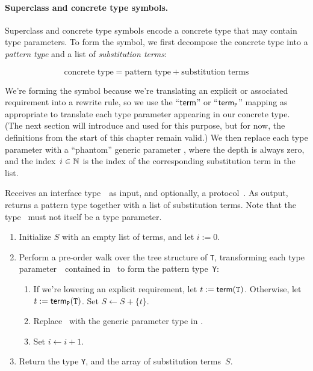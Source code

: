 \documentclass[../generics]{subfiles}
\begin{document}
\paragraph{Superclass and concrete type symbols.}
Superclass and concrete type symbols encode a concrete type that may contain type parameters. To form the symbol, we first decompose the concrete type into a \emph{pattern type} and a list of \emph{substitution terms}:
\begin{ceqn}
\[\text{concrete type} = \text{pattern type} + \text{substitution terms}\]
\end{ceqn}
We're forming the symbol because we're translating an explicit or associated requirement into a rewrite rule, so we use the ``$\mathsf{term}$'' or ``$\mathsf{term}_{\texttt{P}}$'' mapping as appropriate to translate each type parameter appearing in our concrete type. (The next section will introduce  and  used for this purpose, but for now, the definitions from the start of this chapter remain valid.) We then replace each type parameter with a ``phantom'' generic parameter , where the depth is always zero, and the index~$i\in\mathbb{N}$ is the index of the corresponding substitution term in the list.

\begin{algorithm}\label{concretesymbolcons}
Receives an interface type~\tX\ as input, and optionally, a protocol~\tP. As output, returns a pattern type together with a list of substitution terms. Note that the type \tX\ must not itself be a type parameter.
\begin{enumerate}
\item Initialize $S$ with an empty list of terms, and let $i:=0$.
\item Perform a pre-order walk over the tree structure of \texttt{T}, transforming each type parameter~\tT\ contained in \tX\ to form the pattern type~\texttt{Y}:
\begin{enumerate}
\item If we're lowering an explicit requirement, let $t := \mathsf{term}(\texttt{T})$. Otherwise, let $t := \mathsf{term}_{\texttt{P}}(\texttt{T})$. Set $S\leftarrow S + \{t\}$.
\item Replace \tT\ with the generic parameter type  in \tX.
\item Set $i\leftarrow i + 1$.
\end{enumerate}
\item Return the type \texttt{Y}, and the array of substitution terms~$S$.
\end{enumerate}
\end{algorithm}
\end{document}
